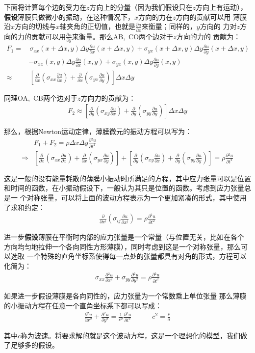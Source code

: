 \documentclass[a4paper]{ctexart}
\newcommand{\pdv}[2]{\frac{\partial{#1}}{\partial{#2}}}
\begin{document}
	下面将计算每个边的受力在$z$方向上的分量（因为我们假设只在$z$方向上有运动），
	\textbf{假设}薄膜只做微小的振动，在这种情况下，$x$方向的力在$z$方向的贡献可以用
	薄膜沿$x$方向的切线与$x$轴夹角的正切值，也就是$\pdv{u}{x}$来衡量；同样的，$y$方向的
	力对$z$方向的力的贡献可以用$\pdv{u}{y}$来衡量。那么AB,\, CO两个边对于$z$方向的力的
	贡献为：
	\begin{align}
		F_{1} =& \,\sigma_{xx}(x+\Delta x, y)\Delta y\pdv{u}{x}(x+\Delta x, y) + \sigma_{yx}(x+\Delta x, y)\Delta y\pdv{u}{y}(x+\Delta x, y)\\
		&- \sigma_{xx}(x, y)\Delta y\pdv{u}{x}(x, y) + \sigma_{yx}(x, y)\Delta y\pdv{u}{y}(x, y)\\
		\approx& \, \left[\pdv{}{x}\left(\sigma_{xx}\pdv{u}{x}\right) + \pdv{}{x}\left(\sigma_{yx}\pdv{u}{y}\right)\right]\Delta x\Delta y
	\end{align}
	\par 同理OA,\, CB两个边对于$z$方向力的贡献为：
	\begin{align}
		F_{2} \approx  \left[\pdv{}{y}\left(\sigma_{xy}\pdv{u}{x}\right) + \pdv{}{y}\left(\sigma_{yy}\pdv{u}{y}\right)\right]\Delta x\Delta y
	\end{align}
	\par 那么，根据Newton运动定律，薄膜微元的振动方程可以写为：
	\begin{align}
		&F_{1} + F_{2} = \rho \Delta x\Delta y \pdv{^{2}u}{t^{2}}\\
		\Rightarrow& \left[\pdv{}{x}\left(\sigma_{xx}\pdv{u}{x}\right) + \pdv{}{x}\left(\sigma_{yx}\pdv{u}{y}\right)\right] + 
		\left[\pdv{}{y}\left(\sigma_{xy}\pdv{u}{x}\right) + \pdv{}{y}\left(\sigma_{yy}\pdv{u}{y}\right)\right] = \rho\pdv{^2 u}{t^{2}}
	\end{align}
	\par 这是一般的没有能量耗散的薄膜小振动时所满足的方程，其中应力张量可以是位置
	和时间的函数，在小振动假设下，一般认为其只是位置的函数。考虑到应力张量总是一
	个对称张量\cite{b}，可以将上面的波动方程表示为一个更加紧凑的形式，其中使用了求和约定：
	\begin{align}
		\pdv{}{x^{i}}\left(\sigma_{ij}\pdv{u}{x^{j}}\right) = \rho\pdv{^2 u}{t^2}
	\end{align}
	
	进一步\textbf{假设}薄膜在平衡时内部的应力张量是一个常量（与位置无关，比如在各个
	方向均匀地拉伸一个各向同性方形薄膜），同时考虑到这是一个对称张量，那么可以选取
	一个特殊的直角坐标系使得每一点处的张量都具有对角的形式，方程可以化简为：
	\begin{align}
		\sigma_{xx}\pdv{^{2}u}{x^{2}} + \sigma_{yy}\pdv{^2 u}{y^2} = \rho \pdv{^{2}u}{t^{2}}
	\end{align}
	\par 如果进一步假设薄膜是各向同性的，应力张量为一个常数乘上单位张量
	那么薄膜的小振动方程在任意一个直角坐标系下都可以写成：
	\begin{align}
		\pdv{^2 u}{x^2} + \pdv{^{2}u}{y^{2}} = \frac{1}{c^{2}}\pdv{^2 u}{t^2}\quad\quad\quad c^2 = \frac{\rho}{\sigma}
		\label{wave eq}
	\end{align}
	\par 其中$c$称为波速。将要求解的就是这个波动方程，这是一个理想化的模型，我们做了足够多的假设。
\end{document}
